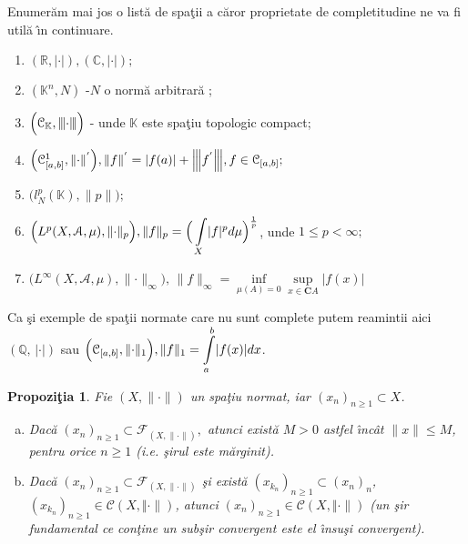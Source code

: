 \documentclass[ a4paper, 12pt]{report}
\newtheorem{prop}[theorem]{\bf Propozi\c tia }
\theoremstyle{definition}
\theoremstyle{remark}
\numberwithin{equation}{section}
\begin{document}
Enumer\u am mai jos o list\u a de spa\c tii a c\u aror proprietate de completitudine ne va fi util\u a \^\i n continuare.
\begin{enumerate}
\item $(\mathbb{R}, \lvert \cdot \rvert), (\mathbb{C}, \lvert \cdot \rvert);$
\item $(\mathbb{K}^{n}, N)$ -$N$ o norm\u a arbitrar\u a ;
\item $\Big(\mathcal{C}_{\mathbb{K}}, {\left\vert\kern-0.25ex\left\vert\kern-0.25ex\left\vert \cdot \right\vert\kern-0.25ex\right\vert\kern-0.25ex\right\vert}\Big)$ - unde $\mathbb{K}$ este spa\c tiu topologic compact;
\item $\Big(\mathcal{C}_{[a,b]}^{1}, \lVert \cdot \rVert^{'}\Big), \lVert f \rVert^{'} = \lvert f(a) \rvert + {\left\vert\kern-0.25ex\left\vert\kern-0.25ex\left\vert f^{'} \right\vert\kern-0.25ex\right\vert\kern-0.25ex\right\vert}, f \in \mathcal{C}_{[a,b]};$
\item $\Big(l_{N}^{p}(\mathbb{K}), \lVert p \rVert\Big);$
\item $\Big( L^{p}(X,\mathcal{A}, \mu), \lVert \cdot \rVert_{p}  \Big), \lVert f \rVert_{p} = \Big( \displaystyle\int\limits_{X} \lvert f \rvert^{p} d\mu \Big )^{\frac{1}{p}}$, unde $1 \leq p < \infty;$
\item $\Big(  L^{\infty}(X,\mathcal{A},\mu), \lVert \cdot \rVert_{\infty}\Big), \, \lVert f \rVert_{\infty} = \inf\limits_{\mu(A) = 0} \sup\limits_{x \in \mathbf{C}A}|f(x)|$
\end{enumerate}
Ca \c si exemple de spa\c tii normate care nu sunt complete putem reamintii aici $(\mathbb{Q}, \, |\cdot|)$ sau
$\Big(\mathcal{C}_{[a,b]}, \lVert \cdot \rVert_{1} \Big), \lVert f \rVert_{1} = \displaystyle\int\limits_{a}^{b}\lvert f(x) \rvert dx$.

\begin{prop}\label{apa}
Fie $(X, \lVert \cdot \rVert)$ un spa\c tiu normat, iar $(x_n)_{n \geq 1} \subset X$.
\begin{enumerate}[(a)]
\item Dac\u a $(x_n)_{n \geq 1} \subset \mathcal{F}_{(X, \lVert \cdot \rVert)},$ atunci  exist\u a $M>0$ astfel \^\i nc\^ at $\lVert x \rVert \leq M$, pentru orice $n \geq 1$ (i.e. \c sirul este m\u arginit).
\item Dac\u a  $(x_n)_{n \geq 1} \subset \mathcal{F}_{(X, \lVert \cdot \rVert)}$ \c si  exist\u a $(x_{k_n})_{n \geq 1} \subset (x_n)_n$, $(x_{k_n})_{n \geq 1} \in \mathcal{C}{(X, \Vert \cdot \rVert)}$, atunci $(x_n)_{n \geq 1} \in \mathcal{C}{(X, \Vert \cdot \rVert)}$ (un \c sir fundamental ce con\c tine un sub\c sir convergent este el \^\i nsu\c si convergent).
\end{enumerate}
\end{prop}
\end{document}
